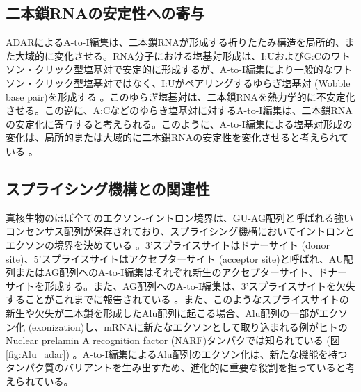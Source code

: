 
\subsection{二本鎖RNAの安定性への寄与}
ADARによるA-to-I編集は、二本鎖RNAが形成する折りたたみ構造を局所的、また大域的に変化させる。RNA分子における塩基対形成は、I:UおよびG:Cのワトソン・クリック型塩基対で安定的に形成するが、A-to-I編集により一般的なワトソン・クリック型塩基対ではなく、I:Uがペアリングするゆらぎ塩基対 (Wobble base pair)を形成する \citep{Barraud:2012aa}。このゆらぎ塩基対は、二本鎖RNAを熱力学的に不安定化させる。この逆に、A:Cなどのゆらき塩基対に対するA-to-I編集は、二本鎖RNAの安定化に寄与すると考えられる。このように、A-to-I編集による塩基対形成の変化は、局所的または大域的に二本鎖RNAの安定性を変化させると考えられている \citep{Nis10}。

\subsection{スプライシング機構との関連性}
真核生物のほぼ全てのエクソン-イントロン境界は、GU-AG配列と呼ばれる強いコンセンサス配列が保存されており、スプライシング機構においてイントロンとエクソンの境界を決めている \citep{Graveley:2001lq}。3'スプライスサイトはドナーサイト (donor site)、5'スプライスサイトはアクセプターサイト (acceptor site)と呼ばれ、AU配列またはAG配列へのA-to-I編集はそれぞれ新生のアクセプターサイト、ドナーサイトを形成する。また、AG配列へのA-to-I編集は、3'スプライスサイトを欠失することがこれまでに報告されている \citep{ValNis05}。また、このようなスプライスサイトの新生や欠失が二本鎖を形成したAlu配列に起こる場合、Alu配列の一部がエクソン化 (exonization)し、mRNAに新たなエクソンとして取り込まれる例がヒトのNuclear prelamin A recognition factor (NARF)タンパクでは知られている (図\ref{fig:Alu_adar}) \citep{SorLevRez0404}。A-to-I編集によるAlu配列のエクソン化は、新たな機能を持つタンパク質のバリアントを生み出すため、進化的に重要な役割を担っていると考えられている。

